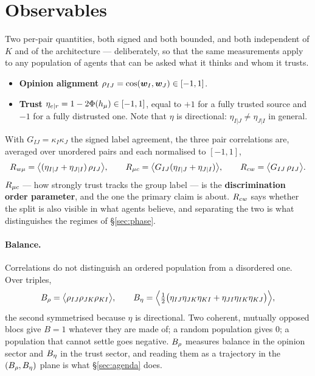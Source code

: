 \section{Observables}
\label{sec:observables}

Two per-pair quantities, both signed and both bounded, and both independent of $K$
and of the architecture --- deliberately, so that the same measurements apply to
any population of agents that can be asked what it thinks and whom it trusts.

\begin{itemize}
  \item \textbf{Opinion alignment} $\rho_{IJ} = \cos(\bm{w}_I, \bm{w}_J) \in [-1, 1]$.
  \item \textbf{Trust} $\eta_{e|r} = 1 - 2\Phi(h_{\mu}) \in [-1,1]$, equal to $+1$ for
    a fully trusted source and $-1$ for a fully distrusted one. Note that $\eta$
    is directional: $\eta_{I|J} \neq \eta_{J|I}$ in general.
\end{itemize}

With $G_{IJ} = \kappa_I \kappa_J$ the signed label agreement, the three pair
correlations are, averaged over unordered pairs and each normalised to $[-1,1]$,
\begin{equation}
  R_{w\mu} = \bigl\langle (\eta_{I|J} + \eta_{J|I})\,\rho_{IJ}\bigr\rangle,
  \qquad
  R_{\mu c} = \bigl\langle G_{IJ}(\eta_{I|J} + \eta_{J|I})\bigr\rangle,
  \qquad
  R_{cw} = \bigl\langle G_{IJ}\,\rho_{IJ}\bigr\rangle .
  \label{eq:correlations}
\end{equation}
$R_{\mu c}$ --- how strongly trust tracks the group label --- is the
\textbf{discrimination order parameter}, and the one the primary claim is about.
$R_{cw}$ says whether the split is also visible in what agents believe, and
separating the two is what distinguishes the regimes of \S\ref{sec:phase}.

\paragraph{Balance.} Correlations do not distinguish an ordered population from a
disordered one. Over triples,
\begin{equation}
  B_{\rho} = \bigl\langle \rho_{IJ}\rho_{JK}\rho_{KI}\bigr\rangle,
  \qquad
  B_{\eta} = \Bigl\langle \tfrac{1}{2}\bigl(\eta_{IJ}\eta_{JK}\eta_{KI}
        + \eta_{JI}\eta_{IK}\eta_{KJ}\bigr)\Bigr\rangle ,
  \label{eq:balance}
\end{equation}
the second symmetrised because $\eta$ is directional. Two coherent, mutually
opposed blocs give $B = 1$ whatever they are made of; a random population gives
$0$; a population that cannot settle goes negative. $B_{\rho}$ measures balance in
the opinion sector and $B_{\eta}$ in the trust sector, and reading them as a
trajectory in the $(B_{\rho}, B_{\eta})$ plane is what \S\ref{sec:agenda} does.

